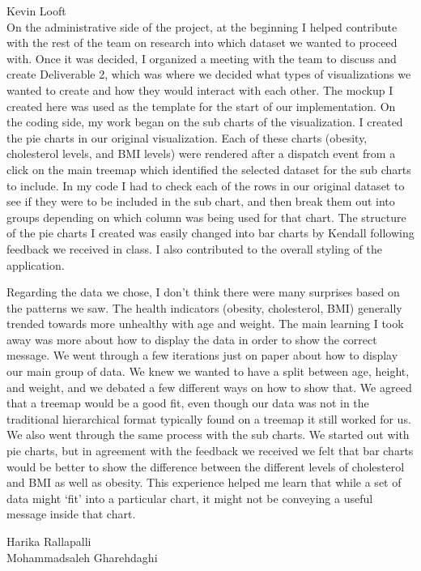 \documentclass[12pt]{article}
\numberwithin{figure}{section}
\begin{document}
{\sf Kevin Looft}\\
On the administrative side of the project, at the beginning I helped contribute with the rest of the team on research into which dataset we wanted to proceed with. Once it was decided, I organized a meeting with the team to discuss and create Deliverable 2, which was where we decided what types of visualizations we wanted to create and how they would interact with each other. The mockup I created here was used as the template for the start of our implementation. On the coding side, my work began on the sub charts of the visualization. I created the pie charts in our original visualization. Each of these charts (obesity, cholesterol levels, and BMI levels) were rendered after a dispatch event from a click on the main treemap which identified the selected dataset for the sub charts to include. In my code I had to check each of the rows in our original dataset to see if they were to be included in the sub chart, and then break them out into groups depending on which column was being used for that chart. The structure of the pie charts I created was easily changed into bar charts by Kendall following feedback we received in class. I also contributed to the overall styling of the application.

Regarding the data we chose, I don’t think there were many surprises based on the patterns we saw. The health indicators (obesity, cholesterol, BMI) generally trended towards more unhealthy with age and weight. The main learning I took away was more about how to display the data in order to show the correct message. We went through a few iterations just on paper about how to display our main group of data. We knew we wanted to have a split between age, height, and weight, and we debated a few different ways on how to show that. We agreed that a treemap would be a good fit, even though our data was not in the traditional hierarchical format typically found on a treemap it still worked for us. We also went through the same process with the sub charts. We started out with pie charts, but in agreement with the feedback we received we felt that bar charts would be better to show the difference between the different levels of cholesterol and BMI as well as obesity. This experience helped me learn that while a set of data might ‘fit’ into a particular chart, it might not be conveying a useful message inside that chart.

{\sf Harika Rallapalli}\\

{\sf Mohammadsaleh Gharehdaghi}\\
\end{document}
